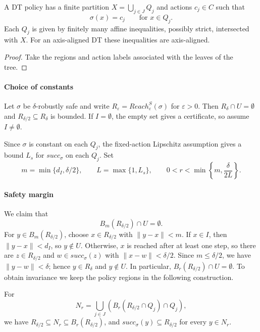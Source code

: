 \documentclass[runningheads]{llncs}
\begin{document}
\begin{lemma}
A DT policy has a finite partition $X=\bigcup_{j\in J}Q_j$ and actions $c_j\in C$ such that
\[
\sigma(x)=c_j\qquad\text{for }x\in Q_j.
\]
Each $Q_j$ is given by finitely many affine inequalities, possibly strict, intersected with $X$. For an axis-aligned DT these inequalities are axis-aligned.
\end{lemma}

\begin{proof}
Take the regions and action labels associated with the leaves of the tree.
\end{proof}

\paragraph{Choice of constants}
Let $\sigma$ be $\delta$-robustly safe and write
$R_\varepsilon=Reach^S_\varepsilon(\sigma)$ for $\varepsilon>0$.
Then $R_\delta\cap U=\emptyset$ and $R_{\delta/2}\subseteq R_\delta$ is bounded.
If $I=\emptyset$, the empty set gives a certificate, so assume $I\ne\emptyset$.


Since $\sigma$ is constant on each $Q_j$, the fixed-action Lipschitz assumption gives a bound $L_s$ for $succ_\sigma$ on each $Q_j$. Set
\[
m=\min\{d_I,\delta/2\},\qquad L=\max\{1,L_s\},\qquad
0<r<\min\left\{m,\frac{\delta}{2L}\right\}.
\]

\paragraph{Safety margin}
We claim that
\[
B_m(R_{\delta/2})\cap U=\emptyset.
\]
For $y\in B_m(R_{\delta/2})$, choose $x\in R_{\delta/2}$ with $\|y-x\|<m$.
If $x\in I$, then $\|y-x\|<d_I$, so $y\notin U$.
Otherwise, $x$ is reached after at least one step, so there are $z\in R_{\delta/2}$ and $w\in succ_\sigma(z)$ with $\|x-w\|<\delta/2$.
Since $m\leq\delta/2$, we have $\|y-w\|<\delta$; hence $y\in R_\delta$ and $y\notin U$.
In particular, $B_r(R_{\delta/2})\cap U=\emptyset$.
To obtain invariance we keep the policy regions in the following construction.

\begin{lemma}
For
\[
N_r=\bigcup_{j\in J}\left(B_r(R_{\delta/2}\cap Q_j)\cap Q_j\right),
\]
we have $R_{\delta/2}\subseteq N_r\subseteq B_r(R_{\delta/2})$, and
$succ_\sigma(y)\subseteq R_{\delta/2}$ for every $y\in N_r$.
\end{lemma}
\end{document}
